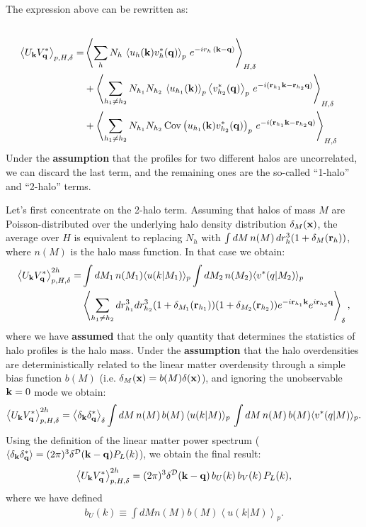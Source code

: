 \documentclass{article}
\begin{document}
  The expression above can be rewritten as:
  \begin{align}\\
    \left\langle U_{\bf k}V^*_{\bf q}\right\rangle_{p,H,\delta}=&\left\langle\sum_h N_h\,\left\langle u_h({\bf k})v^*_h({\bf q})\right\rangle_p\,e^{-ir_h\,({\bf k}-{\bf q})}\right\rangle_{H,\delta}\\
    &+\left\langle\sum_{h_1\neq h_2}N_{h_1}N_{h_2}\,\left\langle u_{h_1}({\bf k})\right\rangle_p\left\langle v^*_{h_2}({\bf q})\right\rangle_p\,e^{-i({\bf r}_{h_1}{\bf k}-{\bf r}_{h_2}{\bf q})}\right\rangle_{H,\delta}\\
    &+\left\langle\sum_{h_1\neq h_2}N_{h_1}N_{h_2}\,{\rm Cov}\left(u_{h_1}({\bf k})v^*_{h_2}({\bf q})\right)_p\,e^{-i({\bf r}_{h_1}{\bf k}-{\bf r}_{h_2}{\bf q})}\right\rangle_{H,\delta}
  \end{align}
  Under the {\bf assumption} that the profiles for two different halos are uncorrelated, we can discard the last term, and the remaining ones are the so-called ``1-halo'' and ``2-halo'' terms.

  Let's first concentrate on the 2-halo term. Assuming that halos of mass $M$ are Poisson-distributed over the underlying halo density distribution $\delta_M({\bf x})$, the average over $H$ is equivalent to replacing $N_h$ with $\int dM\,n(M)\,dr^3_h(1+\delta_M({\bf r}_h))$, where $n(M)$ is the halo mass function. In that case we obtain:
  \begin{align}
    \left\langle U_{\bf k}V^*_{\bf q}\right\rangle_{p,H,\delta}^{2h}=&\int dM_1\,n(M_1) \langle u(k|M_1)\rangle_p\int dM_2\,n(M_2) \langle v^*(q|M_2)\rangle_p\\&\left\langle\sum_{h_1\neq h_2}dr_{h_1}^3dr_{h_2}^3(1+\delta_{M_1}({\bf r}_{h_1}))(1+\delta_{M_2}({\bf r}_{h_2}))e^{-i{\bf r}_{h_1}{\bf k}}e^{i{\bf r}_{h_2}{\bf q}}\right\rangle_{\delta},
  \end{align}
  where  we have {\bf assumed} that the only quantity that determines the statistics of halo profiles is the halo mass. Under the {\bf assumption} that the halo overdensities are deterministically related to the linear matter overdensity through a simple bias function $b(M)$ (i.e. $\delta_M({\bf x})=b(M)\delta({\bf x})$), and ignoring the unobservable ${\bf k}=0$ mode we obtain:
  \begin{align}
    \left\langle U_{\bf k}V^*_{\bf q}\right\rangle_{p,H,\delta}^{2h}=\left\langle\delta_{\bf k}\delta^*_{\bf q}\right\rangle_\delta\int dM\,n(M)\,b(M)\,\langle u(k|M)\rangle_p\,\int dM\,n(M)\,b(M) \langle v^*(q|M)\rangle_p.
  \end{align}
  Using the definition of the linear matter power spectrum ($\langle\delta_{\bf k}\delta_{\bf q}^*\rangle=(2\pi)^3\delta^{\cal D}({\bf k}-{\bf q})P_L(k)$), we obtain the final result:
  \begin{align}
    \left\langle U_{\bf k}V^*_{\bf q}\right\rangle_{p,H,\delta}^{2h}=(2\pi)^3\delta^{\cal D}({\bf k}-{\bf q})\,b_U(k)\,b_V(k)\,P_L(k),
  \end{align}
  where we have defined
  \begin{align}
    b_U(k)\equiv\int dM n(M) b(M) \left\langle u(k|M)\right\rangle_p.
  \end{align}
\end{document}
